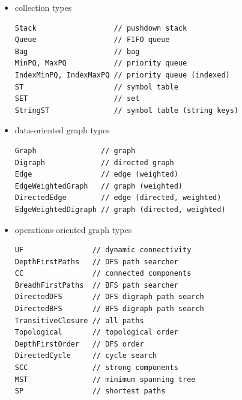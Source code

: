 \documentclass[8pt,a4paper,compress]{beamer}
\begin{document}
\begin{frame}[fragile]
\begin{itemize}
\item collection types
\begin{lstlisting}[language={},mathescape]
Stack                  // pushdown stack
Queue                  // FIFO queue
Bag                    // bag
MinPQ, MaxPQ           // priority queue
IndexMinPQ, IndexMaxPQ // priority queue (indexed)
ST                     // symbol table
SET                    // set
StringST               // symbol table (string keys)
\end{lstlisting}

\item data-oriented graph types
\begin{lstlisting}[language={},mathescape]
Graph               // graph
Digraph             // directed graph
Edge                // edge (weighted)
EdgeWeightedGraph   // graph (weighted)
DirectedEdge        // edge (directed, weighted)
EdgeWeightedDigraph // graph (directed, weighted)
\end{lstlisting}

\item operations-oriented graph types
\begin{lstlisting}[language={},mathescape]
UF                // dynamic connectivity
DepthFirstPaths   // DFS path searcher
CC                // connected components
BreadhFirstPaths  // BFS path searcher
DirectedDFS       // DFS digraph path search
DirectedBFS       // BFS digraph path search
TransitiveClosure // all paths
Topological       // topological order
DepthFirstOrder   // DFS order
DirectedCycle     // cycle search
SCC               // strong components
MST               // minimum spanning tree
SP                // shortest paths
\end{lstlisting}
\end{itemize}
\end{frame}
\end{document}
